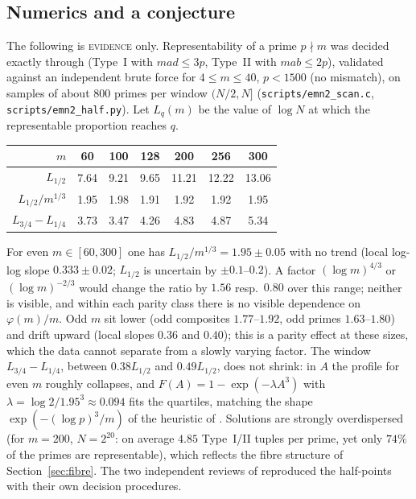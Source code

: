 \documentclass[10pt,reqno]{amsart}
\theoremstyle{definition}
\newcommand{\status}[1]{\textup{\textsc{#1}}}
\begin{document}
\subsection{Numerics and a conjecture}\label{sec:numerics}
The following is \status{evidence} only.  Representability of a prime
$p\nmid m$ was decided exactly through \cite[Cor.~2.2, Cor.~2.4]{PW}
(Type~I with $mad\leq3p$, Type~II with $mab\leq2p$), validated against an
independent brute force for $4\leq m\leq40$, $p<1500$ (no mismatch), on
samples of about 800 primes per window $(N/2,N]$
(\texttt{scripts/emn2\_scan.c}, \texttt{scripts/emn2\_half.py}).  Let
$L_q(m)$ be the value of $\log N$ at which the representable proportion
reaches $q$.

\begin{center}
\small
\begin{tabular}{rcccccc}
\toprule
$m$ & 60 & 100 & 128 & 200 & 256 & 300\\
\midrule
$L_{1/2}$ & 7.64 & 9.21 & 9.65 & 11.21 & 12.22 & 13.06\\
$L_{1/2}/m^{1/3}$ & 1.95 & 1.98 & 1.91 & 1.92 & 1.92 & 1.95\\
$L_{3/4}-L_{1/4}$ & 3.73 & 3.47 & 4.26 & 4.83 & 4.87 & 5.34\\
\bottomrule
\end{tabular}
\end{center}

For even $m\in[60,300]$ one has $L_{1/2}/m^{1/3}=1.95\pm0.05$ with no
trend (local log-log slope $0.333\pm0.02$; $L_{1/2}$ is uncertain by
$\pm0.1$--$0.2$).  A factor $(\log m)^{4/3}$ or $(\log m)^{-2/3}$ would
change the ratio by $1.56$ resp.\ $0.80$ over this range; neither is
visible, and within each parity class there is no visible dependence on
$\varphi(m)/m$.  Odd $m$ sit lower (odd composites $1.77$--$1.92$, odd
primes $1.63$--$1.80$) and drift upward (local slopes $0.36$ and $0.40$);
this is a parity effect at these sizes, which the data cannot separate
from a slowly varying factor.  The window $L_{3/4}-L_{1/4}$, between $0.38L_{1/2}$ and $0.49L_{1/2}$,
does not shrink: in $A$ the profile for even $m$ roughly collapses, and
$F(A)=1-\exp(-\lambda A^3)$ with $\lambda=\log2/1.95^3\approx0.094$ %
fits
the quartiles, matching the shape $\exp(-(\log p)^3/m)$ of the heuristic
of \cite[p.~3]{PW}.  Solutions are strongly overdispersed (for $m=200$,
$N=2^{20}$: on average $4.85$ Type~I/II tuples per prime, yet only $74\%$
of the primes are representable), which reflects the fibre structure of
Section~\ref{sec:fibre}.  The two independent reviews of \cite{MN2}
reproduced the half-points with their own decision procedures.
\end{document}
